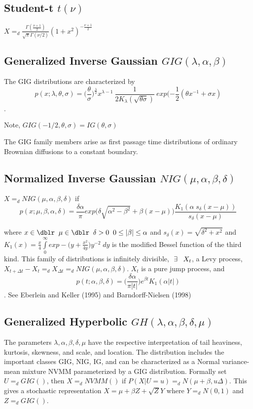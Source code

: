 \subsection{Student-t $t(\nu)$}
$X =_d \frac{\Gamma(\frac{\nu+1}{2})}{\sqrt{\pi} \Gamma(\nu
/2)}(1+x^2)^{- \frac{\nu+1}{2}}$


\subsection{Generalized Inverse Gaussian $GIG(\lambda,\alpha,\beta )$}
The GIG distributions are characterized by\[p(x; \lambda,
\theta,\sigma)=\bigl(\frac{\theta}{\sigma}\bigr)^{\frac{\lambda}{2}}
x^{\lambda-1}\: \frac{1}{2 K_\lambda (\sqrt{\theta \sigma})} \:
exp(-\frac{1}{2} ( \theta x^{-1} + \sigma x) \].

Note,  $GIG(-1/2,\theta,\sigma)=IG(\theta,\sigma)$

The GIG family members arise as first passage time
distributions of ordinary Brownian diffusions to a constant
boundary.

\subsection{ Normalized Inverse Gaussian $NIG(\mu,\alpha,\beta,\delta)$}
$X =_d NIG(\mu,\alpha,\beta,\delta)$ if \[p(x;\mu,
\beta,\alpha,\delta)= \frac{\delta \alpha}{\pi} exp \bigl(
\delta \sqrt{\alpha^2 - \beta^2}+\beta(x-\mu) \bigr)
\frac{K_1(\alpha \; s_\delta(x-\mu))}{s_\delta(x-\mu)}\]

where $x \in \dblr \;\; \mu \in \dblr \;\; \delta>0 \;\; 0 \leq
|\beta| \leq \alpha$ and $s_\delta(x)=\sqrt{\delta^2+x^2}$ and
$K_1(x)=\frac{x}{4} \int\limits_{0}^{\infty} exp - \bigl (
y+\frac{x^2}{4 y} \bigr ) y^{-2} \;dy$ is the modified Bessel
function of the third kind.  This family of distributions is
infinitely divisible, $\; \exists \; \;\; X_t$, a Levy process, $ X_{t+
\Delta t} - X_t =_d X_{\Delta t} =_d
NIG(\mu,\alpha,\beta,\delta)$. $X_t$ is a pure jump process,
and
\[p(t; \alpha,\beta,\delta)= \biggl( \frac{\delta \alpha}{\pi |t|}
\biggr) e^{\beta t} K_1(\alpha  |t|)\]. See Eberlein and Keller
(1995) and  Barndorff-Nielsen (1998)


\subsection{Generalized Hyperbolic $GH(\lambda,\alpha,\beta,\delta,\mu)$}
The parameters $\lambda,\alpha,\beta,\delta,\mu$ have the
respective interpretation of tail heaviness, kurtosis,
skewness, and scale, and location.  The distribution includes
the important classes GIG, NIG, IG, and can be characterized as
a Normal variance-mean mixture NVMM parameterized by a GIG
distribution. Formally set $U=_d GIG()$, then $X=_d NVMM( )$ if
$P(X|U=u) =_d N(\mu+ \beta, u \Delta)$.  This gives a
stochastic representation $X= \mu+\beta Z + \sqrt{Z} Y$ where
$Y =_d N(0,1)$ and $Z =_d GIG( )$.

